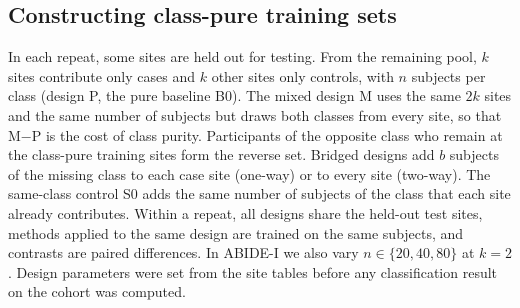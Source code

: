 \begin{table}[tbp]
\centering
\caption{Cohorts and the class-pure constructions used in this study. $n$: subjects per class in a constructed training set; $k$: class-pure sites per class; $b$: bridging subjects per site.}
\label{tab:data}
\end{table}

\subsection{Constructing class-pure training sets}\label{sec:construction}

In each repeat, some sites are held out for testing. From the remaining pool, $k$ sites contribute only cases and $k$ other sites only controls, with $n$ subjects per class (design P, the pure baseline B0). The mixed design M uses the same $2k$ sites and the same number of subjects but draws both classes from every site, so that M$-$P is the cost of class purity. Participants of the opposite class who remain at the class-pure training sites form the reverse set. Bridged designs add $b$ subjects of the missing class to each case site (one-way) or to every site (two-way). The same-class control S0 adds the same number of subjects of the class that each site already contributes. Within a repeat, all designs share the held-out test sites, methods applied to the same design are trained on the same subjects, and contrasts are paired differences. In ABIDE-I we also vary $n\in\{20,40,80\}$ at $k=2$. Design parameters were set from the site tables before any classification result on the cohort was computed.

